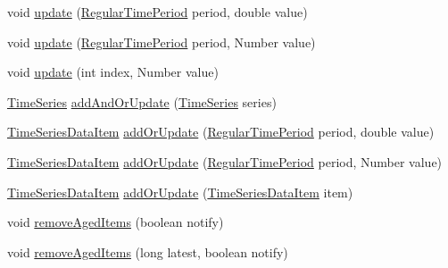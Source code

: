 \begin{DoxyCompactItemize}
\item 
void \mbox{\hyperlink{classorg_1_1jfree_1_1data_1_1time_1_1_time_series_a0aec4775d79a7a21b0fd506041541c67}{update}} (\mbox{\hyperlink{classorg_1_1jfree_1_1data_1_1time_1_1_regular_time_period}{Regular\+Time\+Period}} period, double value)
\item 
void \mbox{\hyperlink{classorg_1_1jfree_1_1data_1_1time_1_1_time_series_a2cadf5e397cd313b26ed26b1c7e0655d}{update}} (\mbox{\hyperlink{classorg_1_1jfree_1_1data_1_1time_1_1_regular_time_period}{Regular\+Time\+Period}} period, Number value)
\item 
void \mbox{\hyperlink{classorg_1_1jfree_1_1data_1_1time_1_1_time_series_a29b4b497af7a65eab2b191facbe0fde9}{update}} (int index, Number value)
\item 
\mbox{\hyperlink{classorg_1_1jfree_1_1data_1_1time_1_1_time_series}{Time\+Series}} \mbox{\hyperlink{classorg_1_1jfree_1_1data_1_1time_1_1_time_series_a1446c2ad2cb40477b985188882048de1}{add\+And\+Or\+Update}} (\mbox{\hyperlink{classorg_1_1jfree_1_1data_1_1time_1_1_time_series}{Time\+Series}} series)
\item 
\mbox{\hyperlink{classorg_1_1jfree_1_1data_1_1time_1_1_time_series_data_item}{Time\+Series\+Data\+Item}} \mbox{\hyperlink{classorg_1_1jfree_1_1data_1_1time_1_1_time_series_a8db35a690b1aeb6aad87cefce17bdfee}{add\+Or\+Update}} (\mbox{\hyperlink{classorg_1_1jfree_1_1data_1_1time_1_1_regular_time_period}{Regular\+Time\+Period}} period, double value)
\item 
\mbox{\hyperlink{classorg_1_1jfree_1_1data_1_1time_1_1_time_series_data_item}{Time\+Series\+Data\+Item}} \mbox{\hyperlink{classorg_1_1jfree_1_1data_1_1time_1_1_time_series_a0e8779cd4e219e0908c68ceeb2f7c970}{add\+Or\+Update}} (\mbox{\hyperlink{classorg_1_1jfree_1_1data_1_1time_1_1_regular_time_period}{Regular\+Time\+Period}} period, Number value)
\item 
\mbox{\hyperlink{classorg_1_1jfree_1_1data_1_1time_1_1_time_series_data_item}{Time\+Series\+Data\+Item}} \mbox{\hyperlink{classorg_1_1jfree_1_1data_1_1time_1_1_time_series_ad544734221ab25ca1b6e18deb90306fa}{add\+Or\+Update}} (\mbox{\hyperlink{classorg_1_1jfree_1_1data_1_1time_1_1_time_series_data_item}{Time\+Series\+Data\+Item}} item)
\item 
void \mbox{\hyperlink{classorg_1_1jfree_1_1data_1_1time_1_1_time_series_a6d867845d16191792f026af279cdc718}{remove\+Aged\+Items}} (boolean notify)
\item 
void \mbox{\hyperlink{classorg_1_1jfree_1_1data_1_1time_1_1_time_series_a112145d557ccea009e584a47aff01c96}{remove\+Aged\+Items}} (long latest, boolean notify)

\end{DoxyCompactItemize}

